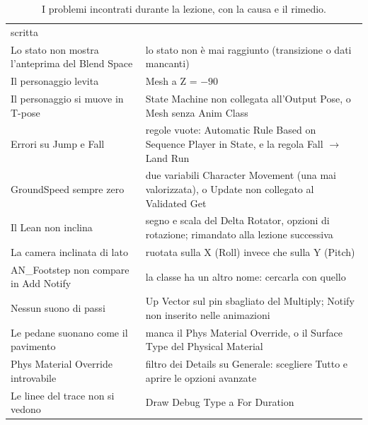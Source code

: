 \begin{table}[htbp]
\begin{tabular}{@{}p{5.4cm}p{8.6cm}@{}}
scritta \\
Lo stato non mostra l'anteprima del Blend Space & lo stato non è mai raggiunto
(transizione o dati mancanti) \\
Il personaggio levita & Mesh a Z = $-90$ \\
Il personaggio si muove in T-pose & State Machine non collegata all'Output Pose, o
Mesh senza Anim Class \\
Errori su Jump e Fall & regole vuote: Automatic Rule Based on Sequence Player in State, e
la regola Fall $\rightarrow$ Land Run \\
GroundSpeed sempre zero & due variabili Character Movement (una mai valorizzata), o
Update non collegato al Validated Get \\
Il Lean non inclina & segno e scala del Delta Rotator, opzioni di rotazione; rimandato
alla lezione successiva \\
La camera inclinata di lato & ruotata sulla X (Roll) invece che sulla Y (Pitch) \\
AN\_Footstep non compare in Add Notify & la classe ha un altro nome: cercarla con quello
\\
Nessun suono di passi & Up Vector sul pin sbagliato del Multiply; Notify non inserito
nelle animazioni \\
Le pedane suonano come il pavimento & manca il Phys Material Override, o il Surface Type
del Physical Material \\
Phys Material Override introvabile & filtro dei Details su Generale: scegliere Tutto e
aprire le opzioni avanzate \\
Le linee del trace non si vedono & Draw Debug Type a For Duration \\
\bottomrule
\end{tabular}
\caption{I problemi incontrati durante la lezione, con la causa e il rimedio.}
\label{ue10:tab:errori}
\end{table}

